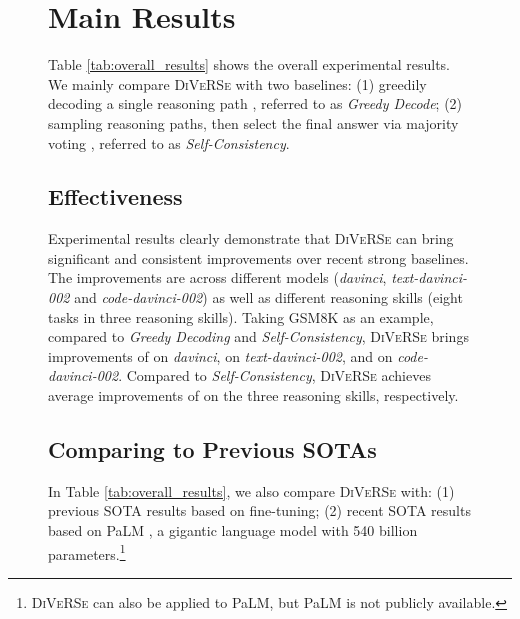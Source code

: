 \documentclass[11pt,a4paper]{article}
\begin{document}
\begin{figure}[t]
\begin{tcolorbox}[colback=blue!5!white,colframe=blue!75!black,title=Chain-Of-Thought Reasoning for GSM8K Math Word Problem,fontupper=\footnotesize,fonttitle=\scriptsize]
\section{Main Results}
\label{section:results}

Table \ref{tab:overall_results} shows the overall experimental results.
We mainly compare \textsc{DiVeRSe} with two baselines: (1) greedily decoding a single reasoning path \cite{wei2022chain}, referred to as \emph{Greedy Decode}; (2) sampling   reasoning paths, then select the final answer via majority voting \cite{selfconsistency}, referred to as \emph{Self-Consistency}.

\subsection{Effectiveness}
Experimental results clearly demonstrate that \textsc{DiVeRSe} can bring significant and consistent improvements over recent strong baselines.
The improvements are across different models (\emph{davinci}, \emph{text-davinci-002} and \emph{code-davinci-002}) as well as different reasoning skills (eight tasks in three reasoning skills).
Taking GSM8K as an example, compared to \emph{Greedy Decoding} and \emph{Self-Consistency}, \textsc{DiVeRSe} brings improvements of  on \emph{davinci},  on \emph{text-davinci-002}, and  on \emph{code-davinci-002}.
Compared to \emph{Self-Consistency}, \textsc{DiVeRSe} achieves average improvements of  on the three reasoning skills, respectively.



\subsection{Comparing to Previous SOTAs}
In Table \ref{tab:overall_results}, we also compare \textsc{DiVeRSe} with:
(1) previous SOTA results based on fine-tuning;
(2) recent SOTA results \cite{wei2022chain} based on PaLM \cite{chowdhery2022palm}, a gigantic language model with 540 billion parameters.\footnote{\textsc{DiVeRSe} can also be applied to PaLM, but PaLM is not publicly available.}


\end{tcolorbox}
\end{figure}
\end{document}
